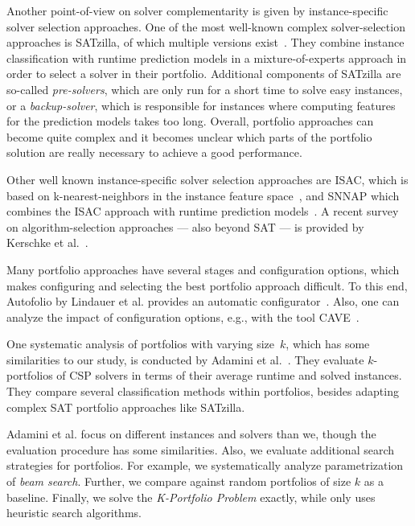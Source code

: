 \documentclass[conference]{IEEEtran}
\begin{document}
Another point-of-view on solver complementarity is given by instance-specific solver selection approaches. 
One of the most well-known complex solver-selection approaches is SATzilla, of which multiple versions exist~\cite{xu2008satzilla, xu2012satzilla2012}. 
They combine instance classification with runtime prediction models in a mixture-of-experts approach in order to select a solver in their portfolio. 
Additional components of SATzilla are so-called \emph{pre-solvers}, which are only run for a short time to solve easy instances, or a \emph{backup-solver}, which is responsible for instances where computing features for the prediction models takes too long. 
Overall, portfolio approaches can become quite complex and it becomes unclear which parts of the portfolio solution are really necessary to achieve a good performance.

Other well known instance-specific solver selection approaches are ISAC, which is based on k-nearest-neighbors in the instance feature space~\cite{Kadioglu:2010:ISAC}, and SNNAP which combines the ISAC approach with runtime prediction models~\cite{Collautti:2013:SNNAP}.
A recent survey on algorithm-selection approaches --- also beyond SAT --- is provided by Kerschke et al.~\cite{kerschke2019automated}.

Many portfolio approaches have several stages and configuration options, which makes configuring and selecting the best portfolio approach difficult.
To this end, Autofolio by Lindauer et al. provides an automatic configurator~\cite{lindauer2015autofolio}.
Also, one can analyze the impact of configuration options, e.g., with the tool CAVE~\cite{biedenkapp2018cave}.

One systematic analysis of portfolios with varying size~$k$, which has some similarities to our study, is conducted by Adamini et al.~\cite{amadini2014empirical, amadini2016extensive}.
They evaluate $k$-portfolios of CSP solvers in terms of their average runtime and solved instances. 
They compare several classification methods within portfolios, besides adapting complex SAT portfolio approaches like SATzilla. 

Adamini et al. focus on different instances and solvers than we, though the evaluation procedure has some similarities. 
Also, we evaluate additional search strategies for portfolios.
For example, we systematically analyze parametrization of \emph{beam search}.
Further, we compare against random portfolios of size $k$ as a baseline.
Finally, we solve the \emph{K-Portfolio Problem} exactly, while \cite{amadini2014empirical} only uses heuristic search algorithms. 
\end{document}
